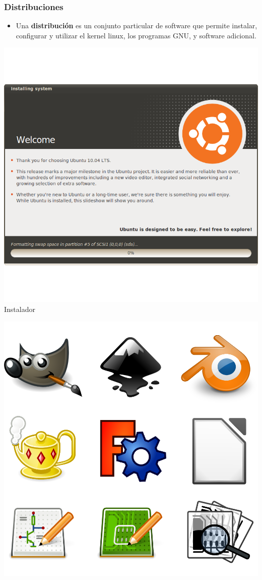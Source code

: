\documentclass[hyperref={colorlinks}]{beamer}
\begin{document}
\begin{frame}
    \frametitle{Distribuciones}
    \begin{itemize}
    \item Una \textbf{distribuci\'on} es un conjunto particular de software que permite instalar, configurar y utilizar el kernel linux, los programas GNU, y software adicional.
    \end{itemize}
	\begin{minipage}[b][.30\textheight][t]{.3\textwidth}
	    \includegraphics[width=.7\textwidth]{figs/ubiquity.png}\\
	    \centering Instalador
    \end{minipage}\hfill
    \begin{minipage}[b][.30\textheight][t]{.3\textwidth}
	    \includegraphics[width=.7\textwidth]{figs/oss.png}\\

\end{minipage}
\end{frame}
\end{document}
